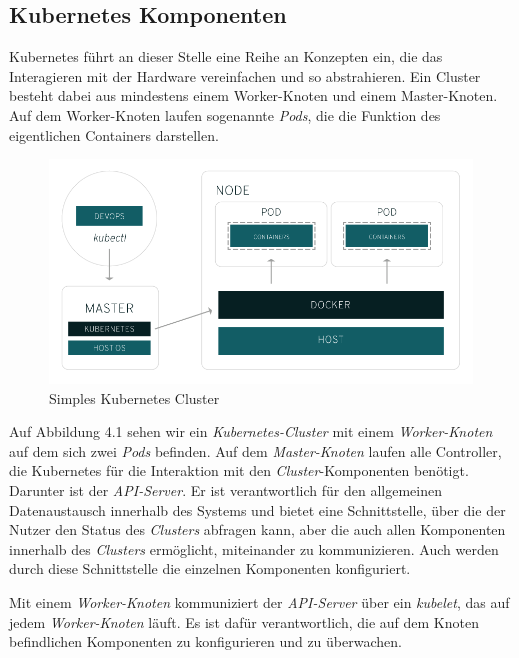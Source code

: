 \documentclass[12pt,a4paper]{scrartcl}
\begin{document}
\subsection{Kubernetes Komponenten}

Kubernetes führt an dieser Stelle eine Reihe an Konzepten\cite{k8sKon} ein, die das Interagieren mit der Hardware\cite{k8sHrd} vereinfachen und so abstrahieren.
Ein Cluster besteht dabei aus mindestens einem Worker-Knoten und einem Master-Knoten. Auf dem Worker-Knoten laufen sogenannte \emph{Pods}, die die Funktion des eigentlichen Containers darstellen. 

\begin{figure}[h!]
	\centering
	\includegraphics[scale=0.5]{KubeSimpleCluster.png}
	\caption[https://www.redhat.com/de/topics/containers/what-is-kubernetes (Stand 25.09.2020)]{Simples Kubernetes Cluster}
\end{figure}

Auf Abbildung 4.1 sehen wir ein \emph{Kubernetes-Cluster} mit einem \emph{Worker-Knoten} auf dem sich zwei \emph{Pods} befinden. Auf dem \emph{Master-Knoten} laufen alle Controller, die Kubernetes für die Interaktion mit den \emph{Cluster}-Komponenten benötigt. Darunter ist der \emph{API-Server}. Er ist verantwortlich für den allgemeinen Datenaustausch innerhalb des Systems und bietet eine Schnittstelle, über die der Nutzer den Status des \emph{Clusters} abfragen kann, aber die auch allen Komponenten innerhalb des \emph{Clusters} ermöglicht, miteinander zu kommunizieren. Auch werden durch diese Schnittstelle die einzelnen Komponenten konfiguriert.

Mit einem \emph{Worker-Knoten} kommuniziert der \textit{API-Server} über ein \emph{kubelet}, das auf jedem \emph{Worker-Knoten} läuft. Es ist dafür verantwortlich, die auf dem Knoten befindlichen Komponenten zu konfigurieren und zu überwachen. 
\end{document}
